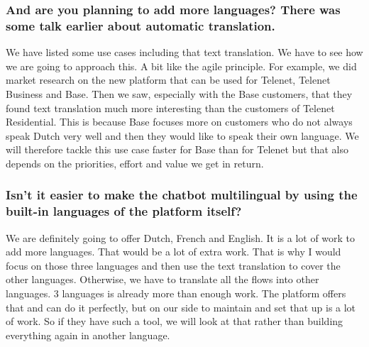\begin{appendices}
	\subsubsection{And are you planning to add more languages? There was some talk earlier about automatic translation.}
	We have listed some use cases including that text translation. We have to see how we are going to approach this. A bit like the agile principle. For example, we did market research on the new platform that can be used for Telenet, Telenet Business and Base. Then we saw, especially with the Base customers, that they found text translation much more interesting than the customers of Telenet Residential. This is because Base focuses more on customers who do not always speak Dutch very well and then they would like to speak their own language. We will therefore tackle this use case faster for Base than for Telenet but that also depends on the priorities, effort and value we get in return.
	
	\subsubsection{Isn't it easier to make the chatbot multilingual by using the built-in languages of the platform itself?}
	We are definitely going to offer Dutch, French and English. It is a lot of work to add more languages. That would be a lot of extra work. That is why I would focus on those three languages and then use the text translation to cover the other languages. Otherwise, we have to translate all the flows into other languages. 3 languages is already more than enough work. The platform offers that and can do it perfectly, but on our side to maintain and set that up is a lot of work. So if they have such a tool, we will look at that rather than building everything again in another language.
	

\end{appendices}
